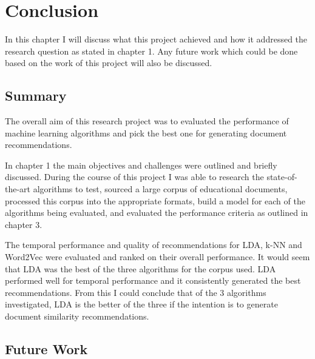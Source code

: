 \chapter{Conclusion}
In this chapter I will discuss what this project achieved and how it addressed the research question as stated in chapter 1.
Any future work which could be done based on the work of this project will also be discussed.

\section{Summary}
The overall aim of this research project was to evaluated the performance of machine learning algorithms and pick the best one for generating document recommendations.

In chapter 1 the main objectives and challenges were outlined and briefly discussed.
During the course of this project I was able to research the state-of-the-art algorithms to test, sourced a large corpus of educational documents, processed this corpus into the appropriate formats, build a model for each of the algorithms being evaluated, and evaluated the performance criteria as outlined in chapter 3.

The temporal performance and quality of recommendations for LDA, k-NN and Word2Vec were evaluated and ranked on their overall performance.
It would seem that LDA was the best of the three algorithms for the corpus used.
LDA performed well for temporal performance and it consistently generated the best recommendations.
From this I could conclude that of the 3 algorithms investigated, LDA is the better of the three if the intention is to generate document similarity recommendations.

\section{Future Work}
